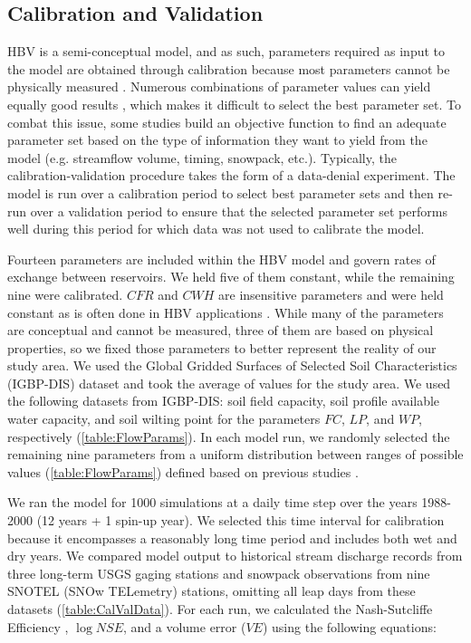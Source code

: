 \documentclass[11pt,letterpaper]{article}
\begin{document}
\subsection{Calibration and Validation}

HBV is a semi-conceptual model, and as such, parameters required as input to the model are obtained through calibration because most parameters cannot be physically measured \citep{Bergstrom:2015ck}. Numerous combinations of parameter values can yield equally good results \citep[i.e. the equifinality issue,][]{Beven:2006wa,Gupta:2005wl}, which makes it difficult to select the best parameter set. To combat this issue, some studies \citep{Madsen:2003un,Inouye:2014ws} build an objective function to find an adequate parameter set based on the type of information they want to yield from the model (e.g. streamflow volume, timing, snowpack, etc.). Typically, the calibration-validation procedure takes the form of a data-denial experiment. The model is run over a calibration period to select best parameter sets and then re-run over a validation period to ensure that the selected parameter set performs well during this period for which data was not used to calibrate the model.

Fourteen parameters are included within the HBV model and govern rates of exchange between reservoirs. We held five of them constant, while the remaining nine were calibrated. $CFR$ and $CWH$ are insensitive parameters and were held constant as is often done in HBV applications \citep{Seibert:1997vw}. While many of the parameters are conceptual and cannot be measured, three of them are based on physical properties, so we fixed those parameters to better represent the reality of our study area. We used the Global Gridded Surfaces of Selected Soil Characteristics (IGBP-DIS) dataset \citep{Hope:1994wq} and took the average of values for the study area. We used the following datasets from IGBP-DIS: soil field capacity, soil profile available water capacity, and soil wilting point for the parameters $FC$, $LP$, and $WP$, respectively (\cref{table:FlowParams}). In each model run, we randomly selected the remaining nine parameters from a uniform distribution between ranges of possible values (\cref{table:FlowParams}) defined based on previous studies \citep{Inouye:2014ws,Han:2017tx}. 

We ran the model for 1000 simulations at a daily time step over the years 1988-2000 (12 years + 1 spin-up year). We selected this time interval for calibration because it encompasses a reasonably long time period and includes both wet and dry years. We compared model output to historical stream discharge records from three long-term USGS gaging stations and snowpack observations from nine SNOTEL (SNOw TELemetry) stations, omitting all leap days from these datasets (\cref{table:CalValData}). For each run, we calculated the Nash-Sutcliffe Efficiency \citep[$NSE$,][]{Nash:1970vw}, $\log NSE$, and a volume error ($VE$) using the following equations:
\end{document}
